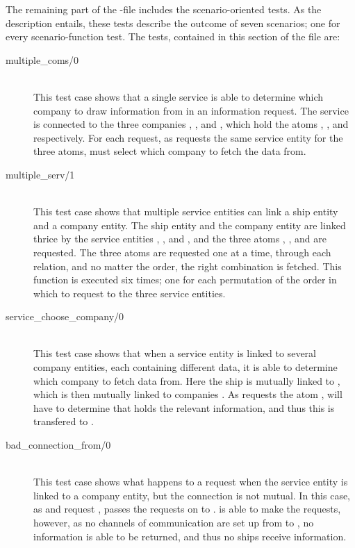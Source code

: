 The remaining part of the -file includes the scenario-oriented tests. As the description entails, these tests describe the outcome of seven scenarios; one for every scenario-function test. The tests, contained in this section of the file are:

\begin{description}
  \item[{multiple\_coms/0}]\ \\
    This test case shows that a single service is able to determine which company to draw information from in an information request. The service  is connected to the three companies , , and , which hold the atoms , , and  respectively. For each request, as  requests the same service entity  for the three atoms,  must select which company to fetch the data from.
  \item[{multiple\_serv/1}]\ \\
    This test case shows that multiple service entities can link a ship entity and a company entity. The ship entity  and the company entity  are linked thrice by the service entities , , and , and the three atoms , , and  are requested. The three atoms are requested one at a time, through each relation, and no matter the order, the right combination is fetched. This function is executed six times; one for each permutation of the order in which to request to the three service entities.
  \item[{service\_choose\_company/0}]\ \\
    This test case shows that when a service entity is linked to several company entities, each containing different data, it is able to determine which company to fetch data from. Here the ship  is mutually linked to , which is then mutually linked to companies \ttt{Com[1..5}. As  requests the atom ,  will have to determine that  holds the relevant information, and thus this is transfered to .
  \item[{bad\_connection\_from/0}]\ \\
    This test case shows what happens to a request when the service entity is linked to a company entity, but the connection is not mutual. In this case, as  and  request ,  passes the requests on to .  is able to make the requests, however, as no channels of communication are set up from  to , no information is able to be returned, and thus no ships receive information.

\end{description}
